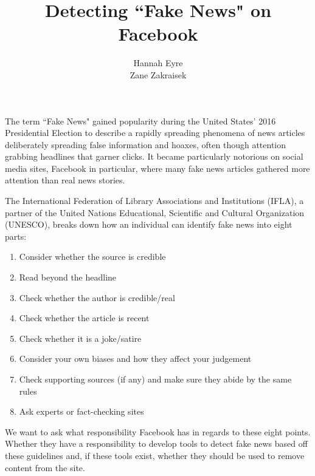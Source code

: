 \documentclass[11pt,letterpage]{article}
\title{Detecting ``Fake News" on Facebook}
\author{Hannah Eyre\\
	Zane Zakraisek}
\begin{document}
\maketitle

The term ``Fake News" gained popularity during the United States' 2016 Presidential Election to describe a rapidly spreading phenomena of news articles deliberately spreading false information and hoaxes, often though attention grabbing headlines that garner clicks. It became particularly notorious on social media sites, Facebook in particular, where many fake news articles gathered more attention than real news stories. 

The International Federation of Library Associations and Institutions (IFLA), a partner of the United Nations Educational, Scientific and Cultural Organization (UNESCO), breaks down how an individual can identify fake news into eight parts:
\begin{enumerate}
\item Consider whether the source is credible
\item Read beyond the headline
\item Check whether the author is credible/real
\item Check whether the article is recent
\item Check whether it is a joke/satire
\item Consider your own biases and how they affect your judgement
\item Check supporting sources (if any) and make sure they abide by the same rules
\item Ask experts or fact-checking sites
\end{enumerate}

We want to ask what responsibility Facebook has in regards to these eight points. Whether they have a responsibility to develop tools to detect fake news based off these guidelines and, if these tools exist, whether they should be used to remove content from the site.
\end{document}
